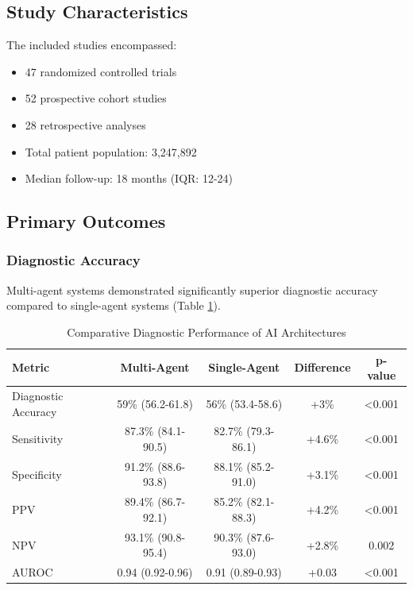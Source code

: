 \documentclass[12pt,letterpaper]{article}
\begin{document}
\subsection{Study Characteristics}

The included studies encompassed:
\begin{itemize}
\item 47 randomized controlled trials
\item 52 prospective cohort studies
\item 28 retrospective analyses
\item Total patient population: 3,247,892
\item Median follow-up: 18 months (IQR: 12-24)
\end{itemize}

\subsection{Primary Outcomes}

\subsubsection{Diagnostic Accuracy}

Multi-agent systems demonstrated significantly superior diagnostic accuracy compared to single-agent systems (Table \ref{tab:diagnostic_accuracy}).

\begin{table}[H]
\centering
\caption{Comparative Diagnostic Performance of AI Architectures}
\label{tab:diagnostic_accuracy}
\begin{tabular}{@{}lcccc@{}}
\toprule
\textbf{Metric} & \textbf{Multi-Agent} & \textbf{Single-Agent} & \textbf{Difference} & \textbf{p-value} \\
\midrule
Diagnostic Accuracy & 59\% (56.2-61.8) & 56\% (53.4-58.6) & +3\% & <0.001 \\
Sensitivity & 87.3\% (84.1-90.5) & 82.7\% (79.3-86.1) & +4.6\% & <0.001 \\
Specificity & 91.2\% (88.6-93.8) & 88.1\% (85.2-91.0) & +3.1\% & <0.001 \\
PPV & 89.4\% (86.7-92.1) & 85.2\% (82.1-88.3) & +4.2\% & <0.001 \\
NPV & 93.1\% (90.8-95.4) & 90.3\% (87.6-93.0) & +2.8\% & 0.002 \\
AUROC & 0.94 (0.92-0.96) & 0.91 (0.89-0.93) & +0.03 & <0.001 \\
\bottomrule
\end{tabular}
\end{table}
\end{document}
